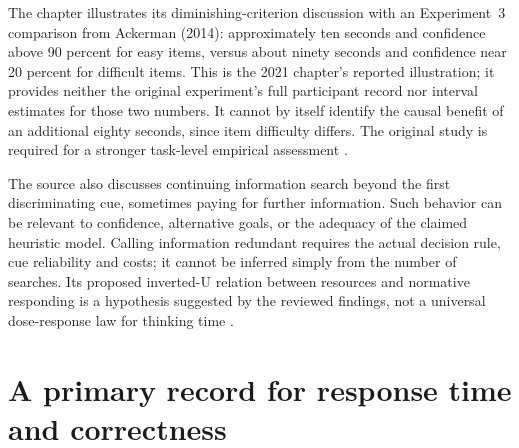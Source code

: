 The chapter illustrates its diminishing-criterion discussion with an
Experiment~3 comparison from Ackerman (2014): approximately ten seconds and
confidence above 90 percent for easy items, versus about ninety seconds and
confidence near 20 percent for difficult items. This is the 2021 chapter's
reported illustration; it provides neither the original experiment's full
participant record nor interval estimates for those two numbers. It cannot
by itself identify the causal benefit of an additional eighty seconds, since
item difficulty differs. The original study is required for a stronger
task-level empirical assessment
\cite[p.~521]{ThompsonElqayamAckerman2021MetaReasoning}.

The source also discusses continuing information search beyond the first
discriminating cue, sometimes paying for further information. Such behavior
can be relevant to confidence, alternative goals, or the adequacy of the
claimed heuristic model. Calling information redundant requires the actual
decision rule, cue reliability and costs; it cannot be inferred simply from
the number of searches. Its proposed inverted-U relation between resources
and normative responding is a hypothesis suggested by the reviewed findings,
not a universal dose-response law for thinking time
\cite[pp.~521--522]{ThompsonElqayamAckerman2021MetaReasoning}.

\section{A primary record for response time and correctness}
\label{sec:p19-r86-stupple}

